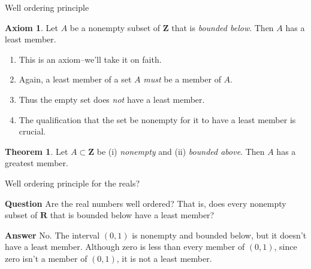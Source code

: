 \documentclass[fleqn]{beamer}
\newcommand{\reals}{\mathbf{R}}
\newcommand{\integers}{\mathbf{Z}}
\theoremstyle{definition}
\newtheorem{myth}{Theorem}
\newtheorem{myaxiom}{Axiom}
\newenvironment{numberlist}
   {\begin{enumerate}[(1)]
       \addtolength{\itemsep}{-0.5\itemsep}}
     {\end{enumerate}}
\begin{document}
\begin{frame}{Well ordering principle}

\begin{myaxiom} Let \(A\) be a nonempty subset of \(\integers\) that is \emph{bounded below}. Then \(A\) has a least member.
\end{myaxiom}

\begin{numberlist}

\item This is an axiom--we'll take it on faith.

\item Again, a least member of a set \(A\) \emph{must} be a member of \(A\).

\item Thus the empty set does \emph{not} have a least member.

\item The qualification that the set be nonempty for it to have a least member is crucial.

\end{numberlist}


\begin{myth} Let \(A \subset \integers\) be (i) \emph{nonempty} and (ii) \emph{bounded above}. Then \(A\) has a greatest  member.
\end{myth}

\end{frame}
\begin{frame}{Well ordering principle for the reals?}

\textbf{Question} Are the real numbers well ordered?  That is, does every nonempty subset of \(\reals\) that is bounded below have a least member?

\vspace{0.5in}
\textbf{Answer} No. The interval \((0,1)\) is nonempty and  bounded below, but it doesn't have a least member. Although zero is less than
every member of \((0,1)\), since zero isn't a member of \((0,1)\), it is not a least member.

\end{frame}
\end{document}
